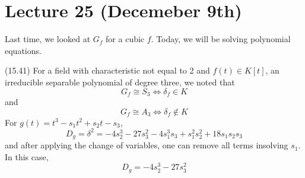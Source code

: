 \section{Lecture 25 (Decemeber 9th)}
\begin{rmk}
Last time, we looked at $G_{f}$ for a cubic $f$. Today, we will be solving polynomial equations.
\end{rmk}
\vspace{2ex}
\begin{ex}
(15.41) For a field with characteristic not equal to 2 and $f(t)\in K[t]$, an irreducible separable polynomial of degree three, we noted that 
\[G_{f}\cong S_3\iff \delta _{f}\in K\]
and
\[G_{f}\cong A_3\iff \delta _{f}\notin K\]
For $g(t)=t^3-s_1t^2+s_2t-s_3$,
\[D_{g}=\delta ^2=-4s_2^{3}-27s_3^2-4s_1^3s_3+s_1^2s_2^2+18s_1s_2s_3\]
and after applying the change of variables, one can remove all terms insolving $s_1$. In this case,
\[D_{g}=-4s_2^3-27s_3^2\]
\end{ex}
\vspace{2ex}
